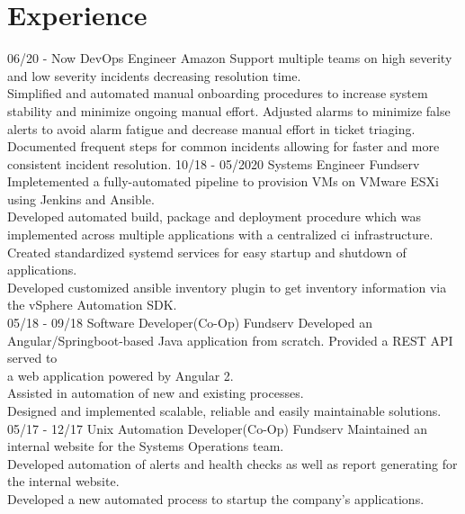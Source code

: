 \documentclass[]{friggeri-cv}
\begin{document}
\section{Experience}
\begin{entrylist}
  \entry
    {06/20 - Now}
    {DevOps Engineer}
    {Amazon}
    {Support multiple teams on high severity and low severity incidents decreasing resolution time. \\
    Simplified and automated manual onboarding procedures to increase system stability and minimize ongoing manual effort.
    Adjusted alarms to minimize false alerts to avoid alarm fatigue and decrease manual effort in ticket triaging.
    Documented frequent steps for common incidents allowing for faster and more consistent incident resolution.}
  \entry
    {10/18 - 05/2020}
    {Systems Engineer}
    {Fundserv}
    {Impletemented a fully-automated pipeline to provision VMs on VMware ESXi using Jenkins and Ansible.\\
    Developed automated build, package and deployment procedure which was implemented across multiple applications with a centralized ci infrastructure.\\
    Created standardized systemd services for easy startup and shutdown of applications.\\
    Developed customized ansible inventory plugin to get inventory information via the vSphere Automation SDK.\\}
  \entry
    {05/18 - 09/18}
    {Software Developer(Co-Op)}
    {Fundserv}
    {Developed an Angular/Springboot-based Java application from scratch. Provided a REST API served to \\
    a web application powered by Angular 2. \\
    Assisted in automation of new and existing processes.\\
    Designed and implemented scalable, reliable and easily maintainable solutions.\\}
  \entry
    {05/17 - 12/17}
    {Unix Automation Developer(Co-Op)}
    {Fundserv}
    {Maintained an internal website for the Systems Operations team.\\
    Developed automation of alerts and health checks as well as report generating for the internal website.\\
    Developed a new automated process to startup the company's applications.\\}
\end{entrylist}
\end{document}
